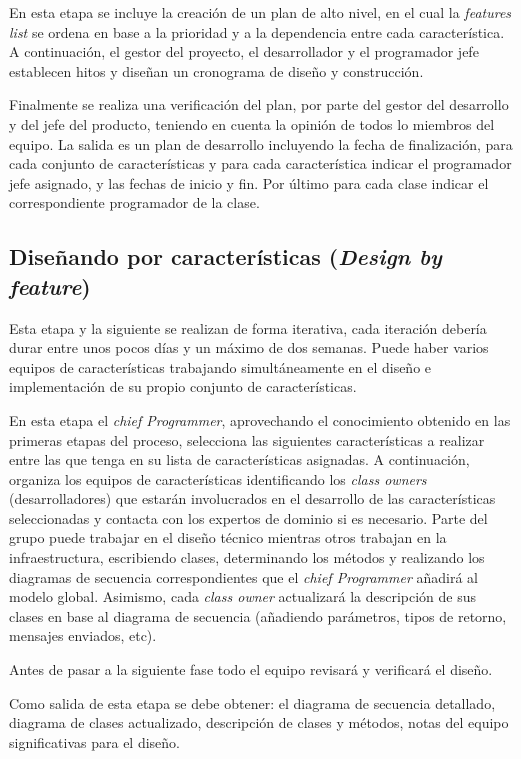 \documentclass[11pt]{article}
\begin{document}
En esta etapa se incluye la creación de un plan de alto nivel, en el cual la \textit{features list} se ordena en base a la prioridad y a la dependencia entre cada característica. A continuación, el gestor del proyecto, el desarrollador y el programador jefe establecen hitos y diseñan un cronograma de diseño y construcción.

Finalmente se realiza una verificación del plan, por parte del gestor del desarrollo y del jefe del producto, teniendo en cuenta la opinión de todos lo miembros del equipo. La salida es un plan de desarrollo incluyendo la fecha de finalización, para cada conjunto de características y para cada característica indicar el programador jefe asignado, y las fechas de inicio y fin. Por último para cada clase indicar el correspondiente programador de la clase.


\subsection{Diseñando por características (\textit{Design by feature})}
Esta etapa y la siguiente se realizan de forma iterativa, cada iteración debería durar entre unos pocos días y un máximo de dos semanas. Puede haber varios equipos de características trabajando simultáneamente en el diseño e implementación de su propio conjunto de características. 

En esta etapa el \textit{chief Programmer}, aprovechando el conocimiento obtenido en las primeras etapas del proceso, selecciona las siguientes características a realizar entre las que tenga en su lista de características asignadas. A continuación, organiza los equipos de características identificando los \textit{class owners} (desarrolladores) que estarán involucrados en el desarrollo de las características seleccionadas y contacta con los expertos de dominio si es necesario. Parte del grupo puede trabajar en el diseño técnico mientras otros trabajan en la infraestructura, escribiendo clases, determinando los métodos y realizando los diagramas de secuencia correspondientes que el \textit{chief Programmer} añadirá al modelo global. Asimismo, cada \textit{class owner} actualizará la descripción de sus clases en base al diagrama de secuencia (añadiendo parámetros, tipos de retorno, mensajes enviados, etc).

Antes de pasar a la siguiente fase todo el equipo revisará y verificará el diseño.

Como salida de esta etapa se debe obtener: el diagrama de secuencia detallado, diagrama de clases actualizado, descripción de clases y métodos, notas del equipo significativas para el diseño.
\end{document}
